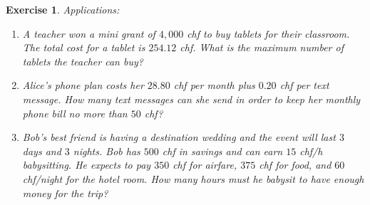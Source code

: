 \documentclass[12pt]{article}
\newtheorem{ex}{Exercise}[section]
\begin{document}
\begin{ex}\label{Ex6} Applications:
\begin{enumerate}
\item[a)] A teacher won a mini grant of $4,000$ chf to buy tablets for their classroom. The total cost for a tablet is $254.12$ chf. What is the maximum number of tablets the teacher can buy?
\item[b)] Alice's phone plan costs her $28.80$ chf per month plus $0.20$ chf per text message. How many text messages can she send in order to keep her monthly phone bill no more than $50$ chf? 
\item[c)] Bob's best friend is having a destination wedding and the event will last $3$ days and $3$ nights. Bob has $500$ chf in savings and can earn $15$ chf/h babysitting. He expects to pay $350$ chf for airfare, $375$ chf for food, and $60$ chf/night for the hotel room. How many hours must he babysit to have enough money for the trip?
\end{enumerate}
\end{ex}
\end{document}
